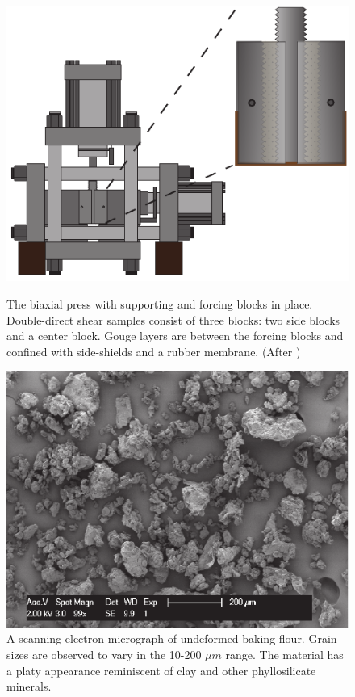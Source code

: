 \begin{figure}
\includegraphics{chap_granular_stiffness/Fig2.pdf}
\label{fig:biax}
\caption{The biaxial press with supporting and forcing blocks in place.  Double-direct shear samples consist of three blocks: two side blocks and a center block.  Gouge layers are between the forcing blocks and confined with side-shields and a rubber membrane. (After \cite{Leeman_2014})}
\end{figure}

\begin{figure}
\begin{center}
\includegraphics{chap_granular_stiffness/Fig3.pdf}
\caption{\label{fig:flour_sem}
A scanning electron micrograph of undeformed baking flour.  Grain sizes are observed to vary in the 10-200 $\mu m$ range.  The material has a platy appearance reminiscent of clay and other phyllosilicate minerals.}
\end{center}
\end{figure}


